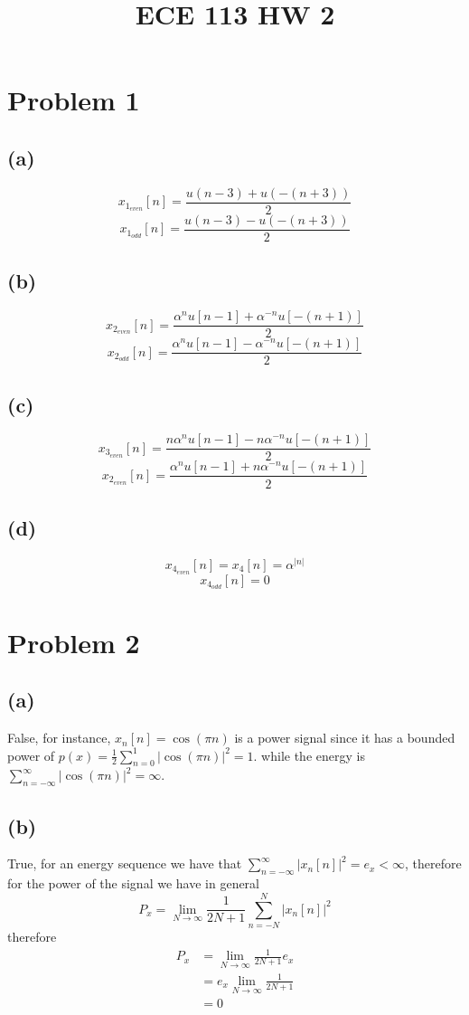 
\title{ECE 113 HW 2}

\maketitle
\section*{Problem 1}
\subsection*{(a)}
$$x_{1_{even}}[n]=\frac{u(n-3)+u(-(n+3))}{2}$$
$$x_{1_{odd}}[n]=\frac{u(n-3)-u(-(n+3))}{2}$$
\subsection*{(b)}
$$x_{2_{even}}[n]=\frac{\alpha^nu[n-1]+\alpha^{-n}u[-(n+1)]}{2}$$
$$x_{2_{odd}}[n]=\frac{\alpha^nu[n-1]-\alpha^{-n}u[-(n+1)]}{2}$$
\subsection*{(c)}

$$x_{3_{even}}[n]=\frac{n\alpha^nu[n-1]-n\alpha^{-n}u[-(n+1)]}{2}$$
$$x_{2_{even}}[n]=\frac{\alpha^nu[n-1]+n\alpha^{-n}u[-(n+1)]}{2}$$
\subsection*{(d)}
$$x_{4_{even}}[n]=x_4[n]=\alpha^{|n|}$$
$$x_{4_{odd}}[n]=0$$
\section*{Problem 2}
\subsection*{(a)}
False, for instance, $x_n[n]=\cos(\pi n)$ is a power signal since it has a bounded 
power of $p(x)=\frac{1}{2}\sum_{n=0}^1|\cos(\pi n)|^2=1$. while the energy is 
$\sum_{n=-\infty}^\infty|\cos(\pi n)|^2=\infty$.
\subsection*{(b)}
True, for an energy sequence we have that $\sum_{n=-\infty}^\infty|x_n[n]|^2=e_x<\infty$,
therefore for the power of the signal we have in general
$$P_x=\lim_{N\rightarrow\infty}\frac{1}{2N+1}\sum_{n=-N}^N|x_n[n]|^2$$
therefore
\begin{align*}
    P_x&=\lim_{N\rightarrow\infty}\frac{1}{2N+1}e_x\\
    &=e_x\lim_{N\rightarrow\infty}\frac{1}{2N+1}\\
    &=0
\end{align*}
